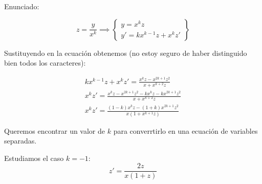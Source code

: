 \documentclass[nochap]{apuntes}
\begin{document}
\begin{problem}[4]
Enunciado:
\solution

\[z=\frac{y}{x^k} \implies \left\{\begin{array}{cc}
y=x^kz\\
y'=kx^{k-1}z+x^kz'
\end{array}\right\}\]

Sustituyendo en la ecuación obtenemos (no estoy seguro de haber distinguido bien todos los caracteres):

\begin{gather*}
kx^{k-1}z + x^kz' = \frac{x^kz - x^{2k+1}z^2}{x+x^{k+2}z}\\
x^kz'= \frac{x^kz-x^{2k+1}z^2 - kx^kz-kx^{2k+1}z^2}{x+x^{k+2}z}\\
x^kz'= \frac{(1-k)x^kz-(1+k)x^{2k+1}z^2}{x(1+x^{k+1}z)}
\end{gather*}

Queremos encontrar un valor de $k$ para converrtirlo en una ecuación de variables separadas.

Estudiamos el caso $k=-1$: \[z' = \frac{2z}{x(1+z)}\]

\end{problem}
\end{document}
